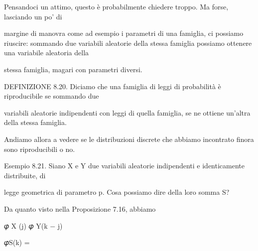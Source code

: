 \documentclass[a4paper,portrait,12pt]{article}
\begin{document}
\begin{flushleft}
Pensandoci un attimo, questo \`{e} probabilmente chiedere troppo. Ma forse, lasciando un po' di
\end{flushleft}


\begin{flushleft}
margine di manovra come ad esempio i parametri di una famiglia, ci possiamo riuscire: sommando due variabili aleatorie della stessa famiglia possiamo ottenere una variabile aleatoria della
\end{flushleft}


\begin{flushleft}
stessa famiglia, magari con parametri diversi.
\end{flushleft}


\begin{flushleft}
DEFINIZIONE 8.20. Diciamo che una famiglia di leggi di probabilit\`{a} \`{e} riproducibile se sommando due
\end{flushleft}


\begin{flushleft}
variabili aleatorie indipendenti con leggi di quella famiglia, se ne ottiene un'altra della stessa famiglia.
\end{flushleft}


\begin{flushleft}
Andiamo allora a vedere se le distribuzioni discrete che abbiamo incontrato finora sono riproducibili o no.
\end{flushleft}


\begin{flushleft}
Esempio 8.21. Siano X e Y due variabili aleatorie indipendenti e identicamente distribuite, di
\end{flushleft}


\begin{flushleft}
legge geometrica di parametro p. Cosa possiamo dire della loro somma S?
\end{flushleft}


\begin{flushleft}
Da quanto visto nella Proposizione 7.16, abbiamo
\end{flushleft}


\begin{flushleft}
𝜑 X (j) 𝜑 Y(k $-$ j)
\end{flushleft}





\begin{flushleft}
𝜑S(k) =
\end{flushleft}
\end{document}
